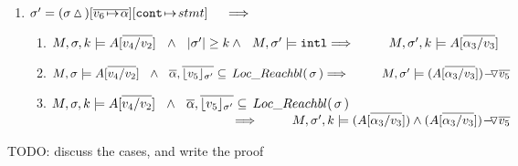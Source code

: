 \begin{lemma}
\begin{enumerate}
\begin{enumerate}
\end{enumerate}
\item
\label{l:calls:caller}
$\sigma'= (\sigma \popSymbol)[\overline{ v_6\! \mapsto\! \alpha}][\prg{cont}\!\mapsto\! stmt]
 \ \ \ \   \Longrightarrow$ 

\begin{enumerate}
\item
\label{l:calls:caller:one}
$\satDAssertFrom M  \sigma k   A[\overline {v_4/v_2}] \ \  \wedge\ \ \DepthSt {\sigma'} \geq k  \wedge\ \ M, \sigma' \models \intThis
\hfill \Longrightarrow   \ \ \ \ \ \ \  \   \satDAssertFrom M  {\sigma'} k   {A[\overline { \alpha_3/v_3}]}$ 

\item
\label{l:calls:caller:two}
$M, \sigma \models  {A[\overline  {v_4/v_2}]}\ \ \wedge\ \  \overline \alpha,  \overline {\interpret {\sigma'} {v_5}} \subseteq \LRelevantO \sigma
\hfill \Longrightarrow   \ \ \ \ \ \ \  \  M , \sigma' \models  {\PushASLong  {\overline {v_5}}   {{(A[\overline {\alpha_3/v_3}])}}}$

\item
\label{l:calls:caller:three}
$\satDAssertFrom M  \sigma k   {A[\overline  {v_4/v_2}]} \ \ \wedge\ \  \overline \alpha, \overline {\interpret {\sigma'} {v_5}} \subseteq \LRelevantO \sigma  $\\  $\strut \hspace{5cm} \hfill \Longrightarrow  \ \ \ \ \ \ \  \  \satDAssertFrom M  {\sigma'} k    {{{(A[\overline {\alpha_3/v_3}])}} \wedge \PushASLong  {\overline {v_5}}   {{(A[\overline {\alpha_3/v_3}])}}}$

 \end{enumerate}
\end{enumerate}

\end{lemma}


TODO: discuss the cases, and write the proof

